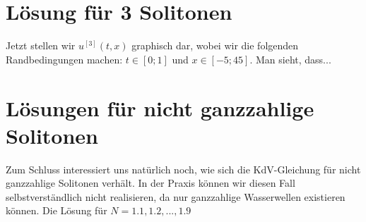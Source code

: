 \documentclass[ngerman]{scrartcl}
\begin{document}
\section{Lösung für 3 Solitonen}
Jetzt stellen wir $u^{[3]}(t,x)$ graphisch dar, wobei wir die folgenden Randbedingungen machen: $t \in [0;1]$ und $x \in [-5;45]$.
Man sieht, dass...

\section{Lösungen für nicht ganzzahlige Solitonen}
Zum Schluss interessiert uns natürlich noch, wie sich die KdV-Gleichung für nicht ganzzahlige Solitonen verhält. In der Praxis können wir diesen Fall selbstverständlich nicht realisieren, da nur ganzzahlige Wasserwellen existieren können. 
Die Lösung für $N=1.1,1.2,...,1.9$ 
\end{document}

